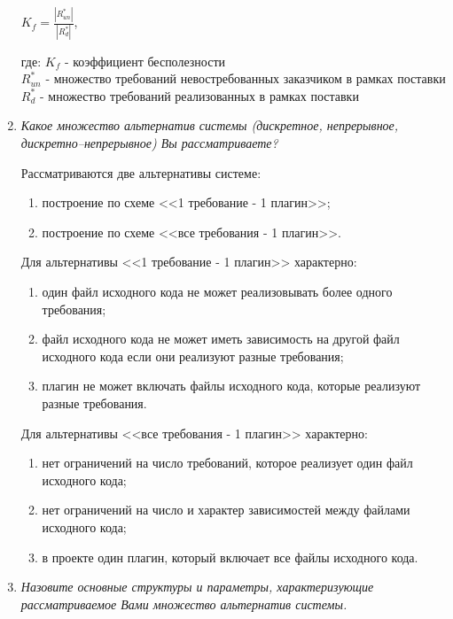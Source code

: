 \documentclass{article}
\begin{document}
\begin{enumerate}
        \begin{center}
            $K_{f} = \frac{|R^*_{un}|}{|R^*_{d}|}$,
        \end{center}

        где: $K_{f}$ - коэффициент бесполезности\\
        $R^*_{un}$ - множество требований невостребованных заказчиком в рамках поставки\\
        $R^*_{d}$ - множество требований реализованных в рамках поставки

        \item \textit{Какое множество альтернатив системы (дискретное, непрерывное, дискретно–непрерывное) Вы рассматриваете?}

        Рассматриваются две альтернативы системе:
        \begin{enumerate}
            \item построение по схеме <<1 требование - 1 плагин>>;
            \item построение по схеме <<все требования - 1 плагин>>.
        \end{enumerate}

        Для альтернативы <<1 требование - 1 плагин>> характерно:
        \begin{enumerate}
            \item один файл исходного кода не может реализовывать более одного требования;
            \item файл исходного кода не может иметь зависимость на другой файл исходного кода если они реализуют разные требования;
            \item плагин не может включать файлы исходного кода, которые реализуют разные требования.
        \end{enumerate}

        Для альтернативы <<все требования - 1 плагин>> характерно:
        \begin{enumerate}
            \item нет ограничений на число требований, которое реализует один файл исходного кода;
            \item нет ограничений на число и характер зависимостей между файлами исходного кода;
            \item в проекте один плагин, который включает все файлы исходного кода.
        \end{enumerate}

        \item \textit{Назовите основные структуры и параметры, характеризующие рассматриваемое Вами множество альтернатив системы.}


\end{enumerate}
\end{document}
